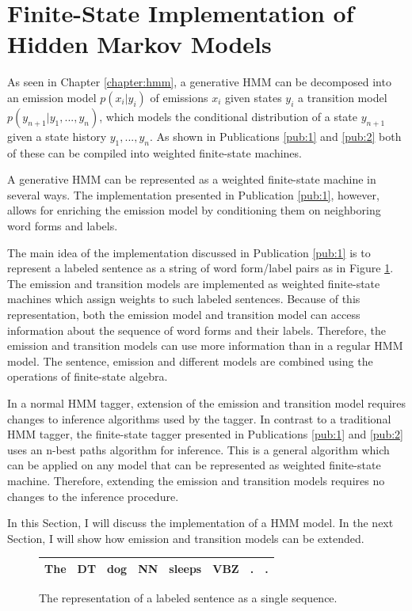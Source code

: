 \section{Finite-State Implementation of Hidden Markov Models} As seen
in Chapter \ref{chapter:hmm}, a generative HMM can be decomposed into
an emission model $p(x_i|y_i)$ of emissions $x_i$ given states $y_i$ a
transition model $p(y_{n+1} | y_1, ..., y_n)$, which models the
conditional distribution of a state $y_{n+1}$ given a state history
$y_1, ..., y_n$. As shown in Publications \ref{pub:1} and \ref{pub:2}
both of these can be compiled into weighted finite-state machines.

A generative HMM can be represented as a weighted finite-state machine
in several ways. The implementation presented in Publication
\ref{pub:1}, however, allows for enriching the emission model by
conditioning them on neighboring word forms and labels.

The main idea of the implementation discussed in Publication
\ref{pub:1} is to represent a labeled sentence as a string of word
form/label pairs as in Figure \ref{fig:lab-sent}. The emission and
transition models are implemented as weighted finite-state machines
which assign weights to such labeled sentences. Because of this
representation, both the emission model and transition model can
access information about the sequence of word forms and their
labels. Therefore, the emission and transition models can use more
information than in a regular HMM model. The sentence, emission and
different models are combined using the operations of finite-state
algebra.

In a normal HMM tagger, extension of the emission and transition model
requires changes to inference algorithms used by the tagger. In
contrast to a traditional HMM tagger, the finite-state tagger
presented in Publications \ref{pub:1} and \ref{pub:2} uses an n-best
paths algorithm for inference. This is a general algorithm which can
be applied on any model that can be represented as weighted
finite-state machine. Therefore, extending the emission and transition
models requires no changes to the inference procedure.

In this Section, I will discuss the implementation of a HMM model. In
the next Section, I will show how emission and transition models can
be extended.

\begin{figure}[!htb]
\begin{center}
\begin{tabular}{|l|l|l|l|l|l|l|l|}
\hline
The & DT & dog & NN & sleeps & VBZ & . & .\\
\hline
\end{tabular}
\caption{The representation of a labeled sentence as a single sequence.}\label{fig:lab-sent}
\end{center}
\end{figure}

